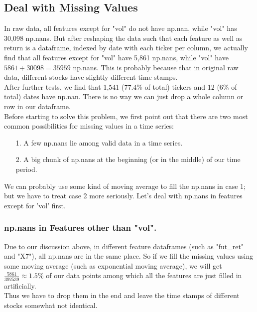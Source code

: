 \documentclass[onecolumn]{article}
\begin{document}
\subsection{Deal with Missing Values}
In raw data, all features except for "vol" do not have np.nan, while "vol" has 30,098 np.nans. But after reshaping the data such that each feature as well as return is a dataframe, indexed by date with each ticker per column, we actually find that all features except for "vol" have 5,861 np.nans, while "vol" have $5861+30098=35959$ np.nans. This is probably because that in original raw data, different stocks have slightly different time stamps.\\
\indent After further tests, we find that 1,541 (77.4\% of total) tickers and 12 (6\% of total) dates have np.nan. There is no way we can just drop a whole column or row in our dataframe.\\
\indent Before starting to solve this problem, we first point out that there are two most common possibilities for missing values in a time series:
\begin{itemize}
    \item[1.] A few np.nans lie among valid data in a time series.
    \item[2.] A big chunk of np.nans at the beginning (or in the middle) of our time period.
\end{itemize}

\noindent We can probably use some kind of moving average to fill the np.nans in case 1; but we have to treat case 2 more seriously. Let's deal with np.nans in features except for 'vol' first.

\subsubsection{np.nans in Features other than "vol".}
Due to our discussion above, in different feature dataframes (such as "fut\_ret" and "X7"), all np.nans are in the same place. So if we fill the missing values using some moving average (such as exponential moving average), we will get $\frac{5861}{392539}\approx1.5\%$ of our data points among which all the features are just filled in artificially.\\
\indent Thus we have to drop them in the end and leave the time stamps of different stocks somewhat not identical.
\end{document}
